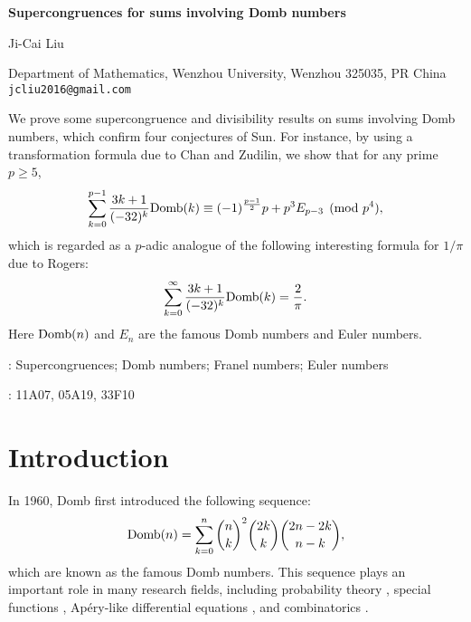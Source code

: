 \documentclass[12pt]{article}
\numberwithin{equation}{section}
\begin{document}
\begin{center}
{\Large\bf Supercongruences for sums involving Domb numbers}
\end{center}

\vskip 2mm \centerline{Ji-Cai Liu}
\begin{center}
{\footnotesize Department of Mathematics, Wenzhou University, Wenzhou 325035, PR China\\
{\tt jcliu2016@gmail.com } \\[10pt]
}
\end{center}


\vskip 0.7cm 
We prove some supercongruence and divisibility results on sums involving Domb numbers, which confirm four conjectures of Sun. For instance, by using a transformation formula due to Chan and Zudilin, we show that for any prime $p\ge 5$,
\begin{align*}
\sum_{k=0}^{p-1}\frac{3k+1}{(-32)^k}{\rm Domb}(k)\equiv (-1)^{\frac{p-1}{2}}p+p^3E_{p-3}
\pmod{p^4},
\end{align*}
which is regarded as a $p$-adic analogue of the following interesting formula for $1/\pi$ due to Rogers:
\begin{align*}
\sum_{k=0}^{\infty}\frac{3k+1}{(-32)^k}{\rm Domb}(k)=\frac{2}{\pi}.
\end{align*}
Here ${\rm Domb}(n)$ and $E_n$ are the famous Domb numbers and Euler numbers.

\vskip 3mm : Supercongruences; Domb numbers; Franel numbers; Euler numbers

\vskip 2mm
: 11A07, 05A19, 33F10

\section{Introduction}
In 1960, Domb \cite{domb-ap-1960} first introduced the following sequence:
\begin{align*}
{\rm Domb}(n)=\sum_{k=0}^n{n\choose k}^2{2k\choose k}{2n-2k\choose n-k},
\end{align*}
which are known as the famous Domb numbers. This sequence plays an important role in many research fields, including probability theory \cite{bnsw-rj-2011}, special functions \cite{bbbg-2008-jpa}, Ap\'ery-like differential equations \cite{avz-pems-2011}, and combinatorics \cite{rs-ejc-2009}.
\end{document}
